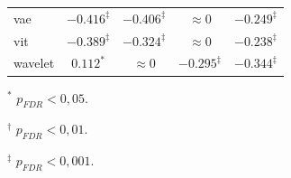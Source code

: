 \begin{table}[htbp]
\begin{threeparttable}
{\begin{tabular}{lcccc}
vae & $-0.416^{\ddagger}$ & $-0.406^{\ddagger}$ & $\approx 0$ & $-0.249^{\ddagger}$ \\
vit & $-0.389^{\ddagger}$ & $-0.324^{\ddagger}$ & $\approx 0$ & $-0.238^{\ddagger}$ \\
wavelet & $0.112^{*}$ & $\approx 0$ & $-0.295^{\ddagger}$ & $-0.344^{\ddagger}$ \\
\bottomrule
\end{tabular}
}
\begin{tablenotes}
\scriptsize
\item $^{*}$ $p_{FDR}<0{,}05$.
\item $^{\dagger}$ $p_{FDR}<0{,}01$.
\item $^{\ddagger}$ $p_{FDR}<0{,}001$.
\end{tablenotes}
\end{threeparttable}
\end{table}
